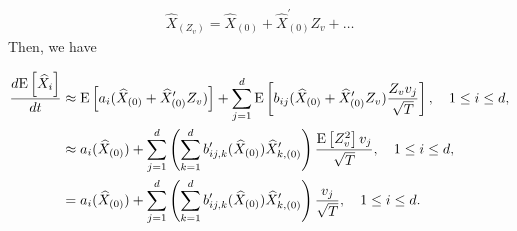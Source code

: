 \begin{align}
\hat{X}_{(Z_v)}=\hat{X}_{(0)}+\hat{X}^\prime_{(0)} Z_v+\dots
\end{align}
Then, we have

\begin{align}\label{eq:first_moment_approximation}
\frac{d\mathrm{E}\left[\widehat{X}_i\right]}{dt}&\approx \mathrm{E}\left[a_i(\widehat{X}_{(0)}+\widehat{X}^\prime_{(0)} Z_v)\right]+\sum_{j=1}^d \mathrm{E}\left[b_{ij}(\widehat{X}_{(0)}+\widehat{X}^\prime_{(0)} Z_v)  \frac{Z_v v_j}{\sqrt{T}}\right], \quad 1 \le i \le d, \nonumber\\ 
&\approx a_i(\widehat{X}_{(0)})+\sum_{j=1}^d \left(\sum_{k=1}^d  b_{ij,k}^\prime(\widehat{X}_{(0)}) \widehat{X}_{k,(0)}^\prime\right) \frac{\mathrm{E}\left[Z_v^2\right] v_j}{\sqrt{T}}, \quad 1 \le i \le d,\nonumber\\ 
&= a_i(\widehat{X}_{(0)})+\sum_{j=1}^d \left(\sum_{k=1}^d  b_{ij,k}^\prime(\widehat{X}_{(0)}) \widehat{X}_{k,(0)}^\prime \right) \frac{v_j}{\sqrt{T}}, \quad 1 \le i \le d.
\end{align} 

